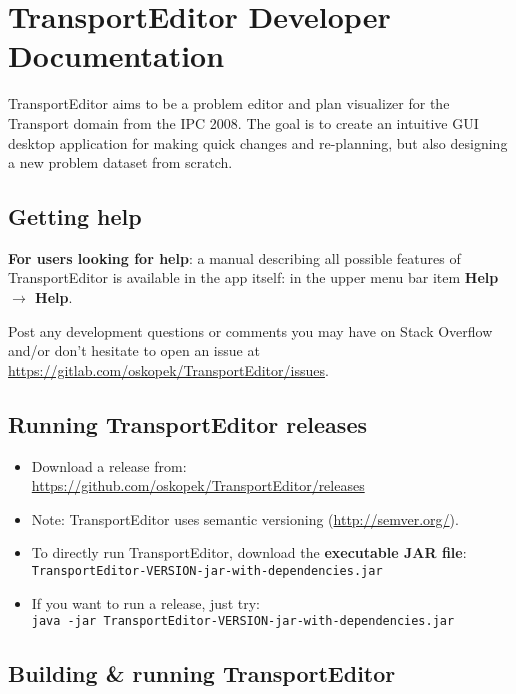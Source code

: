 \newpage

\section*{TransportEditor Developer Documentation}\label{transporteditor-developer-documentation}

TransportEditor aims to be a problem editor and plan visualizer for the Transport domain from the IPC 2008.
The goal is to create an intuitive GUI desktop application for making quick changes and re-planning,
but also designing a new problem dataset from scratch.

\subsection*{Getting help}

\textbf{For users looking for help}: a manual describing all possible features of TransportEditor is available in the app itself:
in the upper menu bar item \textbf{Help $\to$ Help}.

Post any development questions or comments you may have on Stack Overflow and/or don't hesitate to
open an issue at \url{https://gitlab.com/oskopek/TransportEditor/issues}.

\subsection*{Running TransportEditor releases}
\begin{itemize}
\item Download a release from:\\ \url{https://github.com/oskopek/TransportEditor/releases}

\item Note: TransportEditor uses semantic versioning (\url{http://semver.org/}).

\item To directly run TransportEditor, download the \textbf{executable JAR file}: \texttt{TransportEditor-VERSION-jar-with-dependencies.jar}

\item If you want to run a release, just try:\\ \texttt{java -jar TransportEditor-VERSION-jar-with-dependencies.jar}
\end{itemize}

\subsection*{Building \& running TransportEditor}\label{readme-building}

